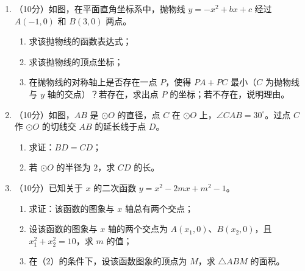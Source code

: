 \documentclass[12pt, a4paper]{ctexart}
\begin{document}
\begin{enumerate}[label=\arabic*., start=17]
\item （10分）如图，在平面直角坐标系中，抛物线 $y = -x^2 + bx + c$ 经过 $A(-1, 0)$ 和 $B(3, 0)$ 两点。
\begin{enumerate}[label=(\arabic*)]
\item 求该抛物线的函数表达式；
\item 求该抛物线的顶点坐标；
\item 在抛物线的对称轴上是否存在一点 $P$，使得 $PA + PC$ 最小（$C$ 为抛物线与 $y$ 轴的交点）？若存在，求出点 $P$ 的坐标；若不存在，说明理由。
\end{enumerate}
\vspace{6cm}

\item （10分）如图，$AB$ 是 $\odot O$ 的直径，点 $C$ 在 $\odot O$ 上，$\angle CAB = 30^\circ$。过点 $C$ 作 $\odot O$ 的切线交 $AB$ 的延长线于点 $D$。
\begin{enumerate}[label=(\arabic*)]
\item 求证：$BD = CD$；
\item 若 $\odot O$ 的半径为 $2$，求 $CD$ 的长。
\end{enumerate}
\vspace{6cm}

\item （10分）已知关于 $x$ 的二次函数 $y = x^2 - 2mx + m^2 - 1$。
\begin{enumerate}[label=(\arabic*)]
\item 求证：该函数的图象与 $x$ 轴总有两个交点；
\item 设该函数的图象与 $x$ 轴的两个交点为 $A(x_1, 0)$、$B(x_2, 0)$，且 $x_1^2 + x_2^2 = 10$，求 $m$ 的值；
\item 在（2）的条件下，设该函数图象的顶点为 $M$，求 $\triangle ABM$ 的面积。
\end{enumerate}
\vspace{6cm}

\end{enumerate}
\end{document}
